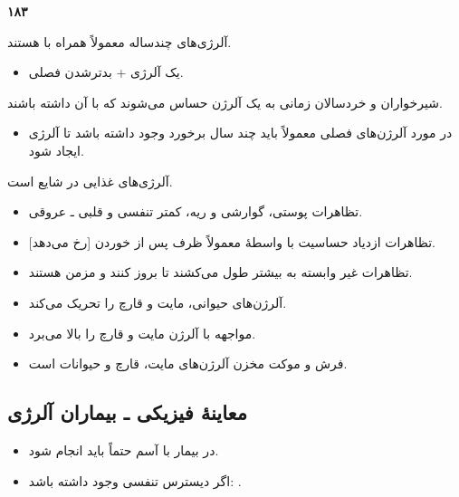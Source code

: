 \noindent\textbf{۱۸۳}\par
آلرژی‌های چندساله معمولاً همراه با  هستند.
\begin{itemize}
\item یک  آلرژی + بدترشدن فصلی.
\end{itemize}
شیرخواران و خردسالان زمانی به یک آلرژن حساس می‌شوند که  با آن داشته باشند.
\begin{itemize}
\item در مورد آلرژن‌های فصلی معمولاً باید چند سال برخورد وجود داشته باشد تا آلرژی ایجاد شود.
\end{itemize}
آلرژی‌های غذایی در  شایع است.
\begin{itemize}
\item تظاهرات پوستی، گوارشی و ریه، کمتر تنفسی و قلبی ـ عروقی.
\item تظاهرات ازدیاد حساسیت با واسطهٔ  معمولاً ظرف  پس از خوردن [رخ می‌دهد].
\item تظاهرات غیر وابسته به  بیشتر طول می‌کشند تا بروز کنند و مزمن هستند.
\end{itemize}
\begin{itemize}
\item {} آلرژن‌های حیوانی، مایت و قارچ را تحریک می‌کند.
\item {} مواجهه با آلرژن مایت و قارچ را بالا می‌برد.
\item فرش و موکت مخزن آلرژن‌های مایت، قارچ و حیوانات است.
\end{itemize}
\subsection*{معاینهٔ فیزیکی ـ بیماران آلرژی}
\begin{itemize}
\item در بیمار با آسم حتماً باید  انجام شود.
\item اگر دیسترس تنفسی وجود داشته باشد: .
\end{itemize}

